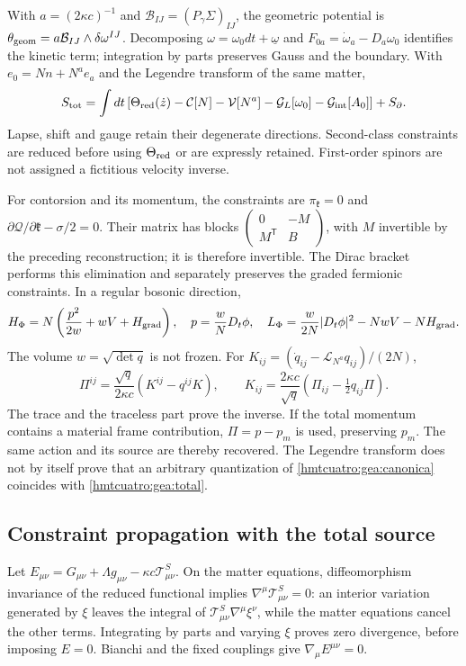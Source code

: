 With $a=(2\kappa c)^{-1}$ and $\mathcal B_{IJ}=(P_\gamma\Sigma)_{IJ}$, the geometric potential is $\theta_{\rm geom}=a\mathcal B_{IJ}\wedge\delta\omega^{IJ}$. Decomposing $\omega=\omega_0dt+\underline\omega$ and $F_{0a}=\dot\omega_a-D_a\omega_0$ identifies the kinetic term; integration by parts preserves Gauss and the boundary. With $e_0=Nn+N^ae_a$ and the Legendre transform of the same matter,
\begin{equation}
S_{\rm tot}=\int dt\,[\Theta_{\rm red}(\dot z)
-\mathcal C[N]-\mathcal V[N^a]-\mathcal G_L[\omega_0]
-\mathcal G_{\rm int}[A_0]]+S_\partial.
\label{hmtcuatro:gea:canonica}
\end{equation}
Lapse, shift and gauge retain their degenerate directions. Second-class constraints are reduced before using $\Theta_{\rm red}$ or are expressly retained. First-order spinors are not assigned a fictitious velocity inverse.

For contorsion and its momentum, the constraints are $\pi_{\mathfrak k}=0$ and $\partial\mathcal Q/\partial\mathfrak k-\sigma/2=0$. Their matrix has blocks $\left(\begin{smallmatrix}0&-M\\M^{\mathsf T}&B\end{smallmatrix}\right)$, with $M$ invertible by the preceding reconstruction; it is therefore invertible. The Dirac bracket performs this elimination and separately preserves the graded fermionic constraints. In a regular bosonic direction,
\[
H_\Phi=N\left(\frac{p^2}{2w}+wV+H_{\rm grad}\right),\quad
p=\frac wN D_t\phi,\quad
L_\Phi=\frac{w}{2N}|D_t\phi|^2-NwV-NH_{\rm grad}.
\]
The volume $w=\sqrt{\det q}$ is not frozen. For $K_{ij}=(\dot q_{ij}-\mathcal L_{N^a}q_{ij})/(2N)$,
\[
\Pi^{ij}=\frac{\sqrt q}{2\kappa c}(K^{ij}-q^{ij}K),\qquad
K_{ij}=\frac{2\kappa c}{\sqrt q}
(\Pi_{ij}-\tfrac12q_{ij}\Pi).
\]
The trace and the traceless part prove the inverse. If the total momentum contains a material frame contribution, $\Pi=p-p_m$ is used, preserving $p_m$. The same action and its source are thereby recovered. The Legendre transform does not by itself prove that an arbitrary quantization of \eqref{hmtcuatro:gea:canonica} coincides with \eqref{hmtcuatro:gea:total}.

\subsection{Constraint propagation with the total source}
\label{hmtcuatro:gea:restricciones}

Let $E_{\mu\nu}=G_{\mu\nu}+\Lambda g_{\mu\nu}
-\kappa c\mathcal T^S_{\mu\nu}$. On the matter equations, diffeomorphism invariance of the reduced functional implies $\nabla^\mu\mathcal T^S_{\mu\nu}=0$: an interior variation generated by $\xi$ leaves the integral of $\mathcal T^S_{\mu\nu}\nabla^\mu\xi^\nu$, while the matter equations cancel the other terms. Integrating by parts and varying $\xi$ proves zero divergence, before imposing $E=0$. Bianchi and the fixed couplings give $\nabla_\mu E^{\mu\nu}=0$.

